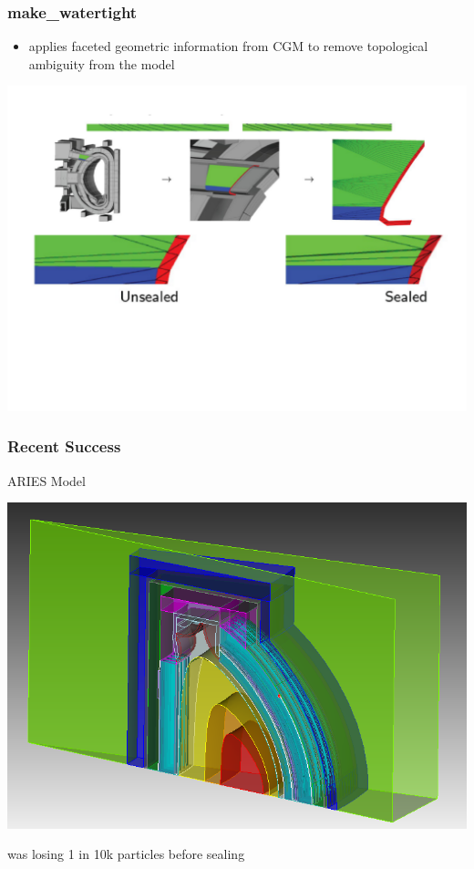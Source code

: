 \documentclass[14pt]{beamer}
\begin{document}
\begin{frame}
\frametitle{make\_watertight}
\begin{itemize}
\item applies faceted geometric information from CGM to remove topological ambiguity from the model
\end{itemize}
\includegraphics[scale=0.4, trim = 20 50 0 0]{sealing_ex.png}
\end{frame}




\begin{frame}
\frametitle{Recent Success}

ARIES Model
\begin{center}
\includegraphics[scale=0.3]{sic.png}
\end{center}
was losing 1 in 10k particles before sealing
\end{frame}
\end{document}

